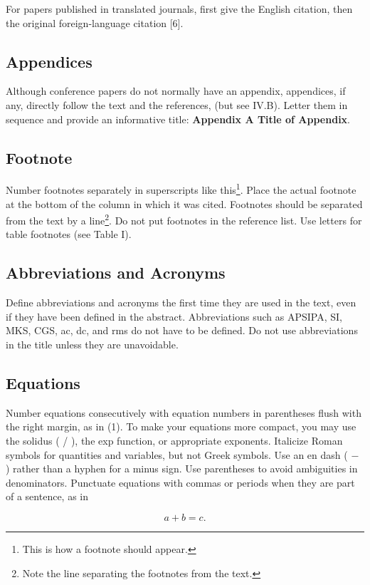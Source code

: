 \documentclass[conference,a4paper]{APSIPA2018}
\begin{document}
For papers published in translated journals, first give the English
citation, then the original foreign-language citation [6].

\subsection{Appendices}
Although conference papers do not normally have an appendix,
appendices, if any, directly follow the text and the references, (but
see IV.B).  Letter them in sequence and provide an informative title:
{\bf Appendix A Title of Appendix}.

\subsection{Footnote}
Number footnotes separately in superscripts like this\footnote{This is
  how a footnote should appear.}.  Place the actual footnote at the
bottom of the column in which it was cited.  Footnotes should be
separated from the text by a line\footnote{Note the line separating
  the footnotes from the text.}.  Do not put footnotes in the
reference list.  Use letters for table footnotes (see Table I).


\subsection{Abbreviations and Acronyms}

Define abbreviations and acronyms the first time they are used in the
text, even if they have been defined in the abstract.  Abbreviations
such as APSIPA, SI, MKS, CGS, ac, dc, and rms do not have to be defined.
Do not use abbreviations in the title unless they are unavoidable.

\subsection{Equations}

Number equations consecutively with equation numbers in parentheses
flush with the right margin, as in (1).  To make your equations more
compact, you may use the solidus ( / ), the exp function, or
appropriate exponents.  Italicize Roman symbols for quantities and
variables, but not Greek symbols.  Use an en dash ( $-$ ) rather than
a hyphen for a minus sign.  Use parentheses to avoid ambiguities in
denominators.  Punctuate equations with commas or periods when they
are part of a sentence, as in

\begin{equation}
 a + b = c.
\end{equation}
\end{document}
